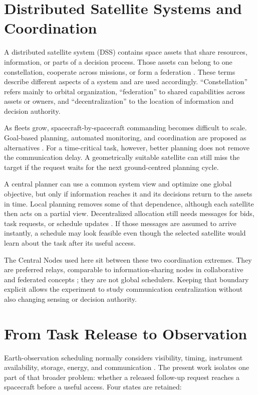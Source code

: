 \section{Distributed Satellite Systems and Coordination}
A distributed satellite system (DSS) contains space assets that share resources, information, or parts of a decision process. Those assets can belong to one constellation, cooperate across missions, or form a federation \citep{Golkar2015,Scrocciolani2024}. These terms describe different aspects of a system and are used accordingly. ``Constellation'' refers mainly to orbital organization, ``federation'' to shared capabilities across assets or owners, and ``decentralization'' to the location of information and decision authority.

As fleets grow, spacecraft-by-spacecraft commanding becomes difficult to scale. Goal-based planning, automated monitoring, and coordination are proposed as alternatives \citep{BenLarbi2021}. For a time-critical task, however, better planning does not remove the communication delay. A geometrically suitable satellite can still miss the target if the request waits for the next ground-centred planning cycle.

A central planner can use a common system view and optimize one global objective, but only if information reaches it and its decisions return to the assets in time. Local planning removes some of that dependence, although each satellite then acts on a partial view. Decentralized allocation still needs messages for bids, task requests, or schedule updates \citep{Parjan2023,Zilberstein2025}. If those messages are assumed to arrive instantly, a schedule may look feasible even though the selected satellite would learn about the task after its useful access.

The Central Nodes used here sit between these two coordination extremes. They are preferred relays, comparable to information-sharing nodes in collaborative and federated concepts \citep{Scrocciolani2024,Messina2025}; they are not global schedulers. Keeping that boundary explicit allows the experiment to study communication centralization without also changing sensing or decision authority.

\section{From Task Release to Observation}
Earth-observation scheduling normally considers visibility, timing, instrument availability, storage, energy, and communication \citep{Ferrari2025}. The present work isolates one part of that broader problem: whether a released follow-up request reaches a spacecraft before a useful access. Four states are retained:

